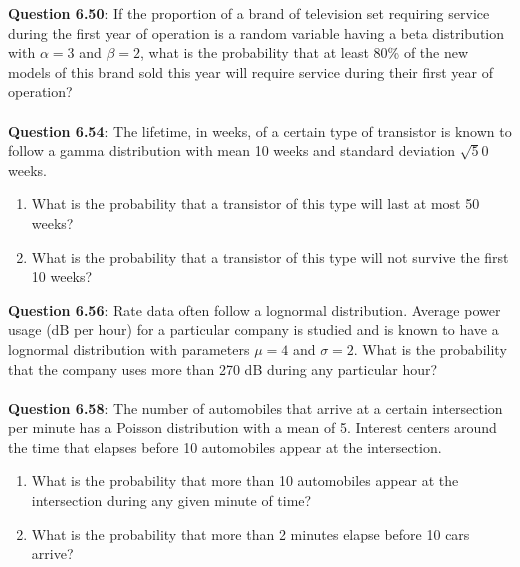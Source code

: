 \documentclass{article}
\begin{document}
    \noindent\textbf{Question 6.50}: If the proportion of a brand of television set 
    requiring service during the first year of operation is a random variable having 
    a beta distribution with $\alpha = 3$ and $\beta = 2$, what is the probability 
    that at least 80\% of the new models of this brand sold this year will require
    service during their first year of operation?\\\\
    
    \noindent\textbf{Question 6.54}: The lifetime, in weeks, of a certain type of 
    transistor is known to follow a gamma distribution with mean 10 weeks and standard 
    deviation $\sqrt50$ weeks.
        \begin{enumerate}[label = (\alph*) ]
            \item What is the probability that a transistor of this type will last at 
            most 50 weeks?
            \item  What is the probability that a transistor of this type will not 
            survive the first 10 weeks?
        \end{enumerate}
    
    \noindent\textbf{Question 6.56}: Rate data often follow a lognormal distribution.
    Average power usage (dB per hour) for a particular company is studied and is known 
    to have a lognormal distribution with parameters $\mu = 4$ and $\sigma = 2$. What
    is the probability that the company uses more than 270 dB during any particular hour?\\\\
    
    \noindent\textbf{Question 6.58}: The number of automobiles that arrive at a certain 
    intersection per minute has a Poisson distribution with a mean of 5. Interest centers 
    around the time that elapses before 10 automobiles appear at the intersection.
        \begin{enumerate}[label = (\alph*) ]
            \item What is the probability that more than 10 automobiles appear at the 
            intersection during any given minute of time?
            \item What is the probability that more than 2 minutes elapse before 10 
            cars arrive?
        \end{enumerate}
\end{document}
